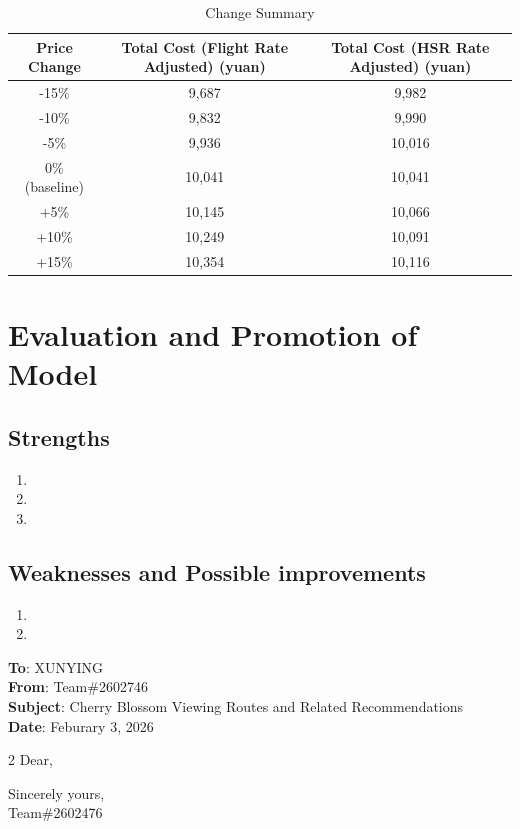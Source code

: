 \documentclass{mcmthesis} %
\begin{document}
\begin{table}[H]
\centering
\caption{Change Summary}
\setlength{\tabcolsep}{4pt} 
\begin{tabular}{@{}ccc@{}}
\toprule
\textbf{Price Change} & \textbf{Total Cost (Flight Rate Adjusted) (yuan)} & \textbf{Total Cost (HSR Rate Adjusted) (yuan)} \\
\midrule
-15\% & 9,687 & 9,982 \\
-10\% & 9,832 & 9,990 \\
-5\%  & 9,936 & 10,016 \\
0\% (baseline) & 10,041 & 10,041 \\
+5\%  & 10,145 & 10,066 \\
+10\% & 10,249 & 10,091 \\
+15\% & 10,354 & 10,116 \\
\bottomrule
\end{tabular}
\end{table}

\section{Evaluation and Promotion of Model}

\subsection{Strengths}

\begin{enumerate}
\item
\item
\item
\end{enumerate}

\subsection{Weaknesses and Possible improvements}

\begin{enumerate}
\item
\item
\end{enumerate}
\newpage
\noindent
\vspace{0.5em}
\textbf{To}: XUNYING\\
\vspace{0.5em}
\textbf{From}: Team\#2602746\\
\vspace{0.5em}
\textbf{Subject}: Cherry Blossom Viewing Routes and Related Recommendations\\
\vspace{0.5em}
\textbf{Date}: Feburary 3, 2026\\
\begin{multicols}{2}
\noindent 
Dear,\\

\begin{flushright}
Sincerely yours,\\
Team\#2602476\\
\end{flushright}
\end{multicols}
\end{document}
